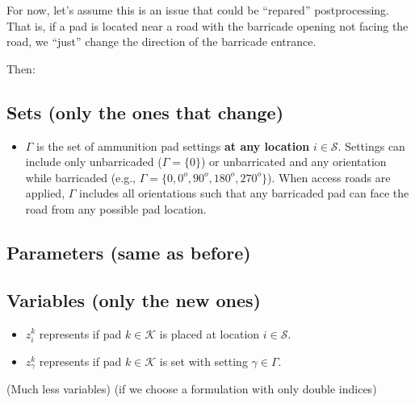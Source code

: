 \documentclass[10pt]{article}
\newcommand{\luiscomm}[1]{{\color{magenta} #1}}
\newcommand{\seancomm}[1]{{\color{blue} #1}}
\begin{document}
For now, let's assume this is an issue that could be ``repared'' postprocessing. That is, if a pad is located near a road with the barricade opening not facing the road, we ``just'' change the direction of the barricade entrance.

Then:

\subsection{Sets (only the ones that change)}
\begin{itemize}
\item $\Gamma$ is the set of ammunition pad settings {\bf at any location} $ i \in \mathcal{S}$. Settings can include only unbarricaded ($\Gamma = \{0\}$) or unbarricated and any orientation while barricaded (e.g., $\Gamma = \{0, 0^o, 90^o, 180^o, 270^o\}$). When access roads are applied, $ \Gamma $ includes all orientations such that any barricaded pad can face the road from any possible pad location. \end{itemize}

\subsection{Parameters (same as before)}

\subsection{Variables (only the new ones)}
\begin{itemize}
		\item $z_{i}^{k} $ represents if pad $ k  \in \mathcal{K}$   is placed at location $ i \in \mathcal{S}$.
		\item $z_{\gamma}^{k} $ represents if pad $ k  \in \mathcal{K}$  is set with setting $ \gamma \in \Gamma$.
	\end{itemize}
	\luiscomm{(Much less variables)}\seancomm{(if we choose a formulation with only double indices)}
\end{document}

